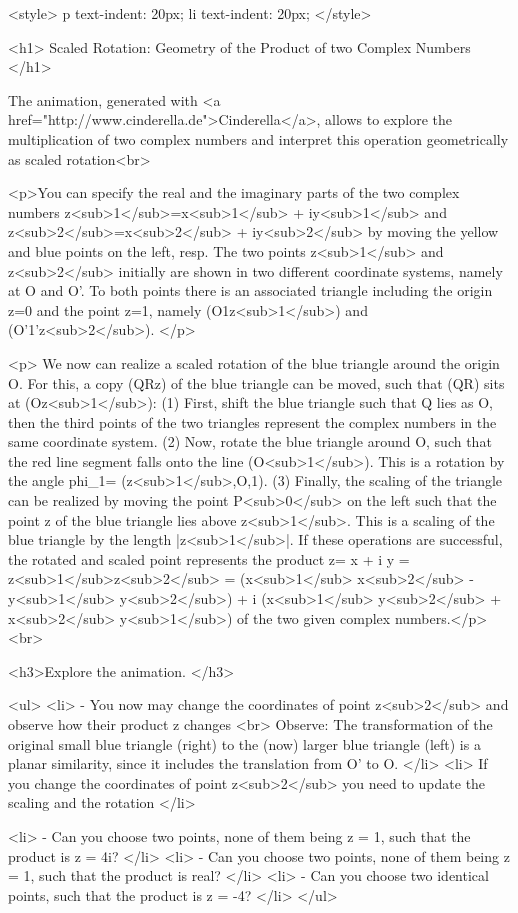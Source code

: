 <style>
p {
  text-indent: 20px;
}
li {
  text-indent: 20px;
}
</style>

<h1> Scaled Rotation: Geometry of the Product of two Complex Numbers </h1>

The animation, generated with <a href="http://www.cinderella.de">Cinderella</a>, allows to explore the multiplication of two complex numbers and interpret this operation geometrically as scaled rotation<br> 

<p>You can specify the real and the imaginary parts of the two complex numbers z<sub>1</sub>=x<sub>1</sub> + iy<sub>1</sub> and z<sub>2</sub>=x<sub>2</sub> + iy<sub>2</sub> by moving the yellow and blue points on the left, resp. The two points z<sub>1</sub> and  z<sub>2</sub> initially are shown in two different coordinate systems, namely  at O and O'. To both points there is an associated triangle including the origin z=0 and the point z=1, namely (O1z<sub>1</sub>) and (O'1'z<sub>2</sub>). 
</p>

<p> We now can realize a scaled rotation of the blue triangle around the origin O. For this, a copy (QRz) of the blue triangle can be moved, such that (QR) sits at (Oz<sub>1</sub>): (1) First, shift the blue triangle such that Q lies as O, then the third points of the two triangles represent the complex numbers in the same coordinate system. (2) Now, rotate the blue triangle around O, such that the red line segment falls onto the line (O<sub>1</sub>). This is a rotation by the angle phi_1= (z<sub>1</sub>,O,1). (3) Finally, the scaling of the triangle can be realized by moving the point P<sub>0</sub> on the left such that the point z of the blue triangle lies above z<sub>1</sub>. This is a scaling of the blue triangle by the length |z<sub>1</sub>|. If these operations are successful, the rotated and scaled point represents the product z= x + i y = z<sub>1</sub>z<sub>2</sub> = (x<sub>1</sub> x<sub>2</sub> -y<sub>1</sub> y<sub>2</sub>) + i (x<sub>1</sub> y<sub>2</sub> + x<sub>2</sub> y<sub>1</sub>) of the two given complex numbers.</p><br>

<h3>Explore the animation. </h3>	
		
		<ul>
		 <li> - You now may change the coordinates of point z<sub>2</sub> and observe how their product z changes <br>
		  Observe: The transformation of the original small blue triangle (right) to the (now) larger blue triangle (left) is a planar similarity, since it includes the translation from O' to O. </li>
		<li> If you change the coordinates of point z<sub>2</sub> you need to update the scaling and the rotation </li>
		
		  <li> - Can you choose two points, none of them being z = 1, such that the product is z = 4i? </li>
		  <li> - Can you choose two points, none of them being z = 1, such that the product is real? </li>
		  <li> - Can you choose two identical points, such that the product is z = -4? </li>
		</ul>
